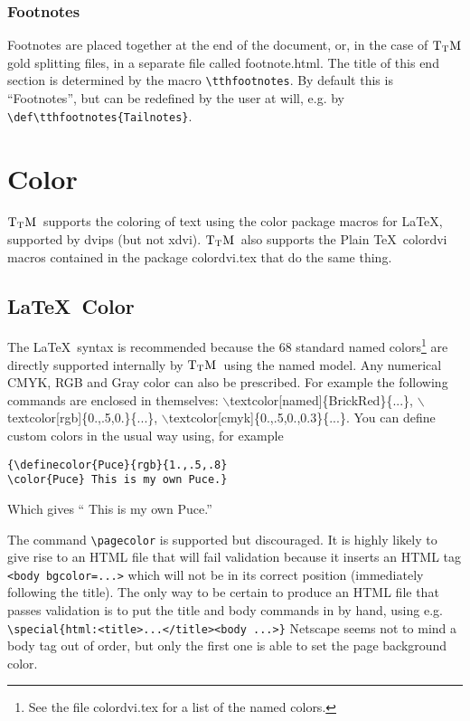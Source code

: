 \documentclass[12pt]{article}
\def\TtM{$\rm{}T_TH$}
\def\TtM{$\rm{}T_TM$}%
\begin{document}
\subsubsection{Footnotes}
Footnotes are placed together at the end of the document, or, in the
case of \TtM gold splitting files, in a separate file called
footnote.html. The title of this end section is determined by the
macro \verb!\tthfootnotes!. By default this is ``Footnotes'', but can
be redefined by the user at will, e.g. by
\verb!\def\tthfootnotes{Tailnotes}!.


\section{Color}
\TtM\ supports the coloring of text using the color package macros for
\LaTeX, supported by dvips (but not xdvi).  \TtM\ also supports the Plain
\TeX\ colordvi macros contained in the package colordvi.tex that do the
same thing. 

\subsection{\LaTeX\ Color}

The \LaTeX\ syntax is recommended because the 68 standard
named colors\footnote{See the file colordvi.tex for a list of
the named colors.} are directly supported internally by \TtM\ using the named
model. Any numerical CMYK, RGB and Gray color can also be prescribed. For
example the following commands are enclosed in themselves:
\textcolor[named]{BrickRed}{$\backslash$textcolor[named]\{BrickRed\}\{...\}},
\textcolor[rgb]{0.,.5,0.}{$\backslash$textcolor[rgb]\{0.,.5,0.\}\{...\}},
\textcolor[cmyk]{0.,.5,0.,.3}{$\backslash$textcolor[cmyk]\{0.,.5,0.,0.3\}\{...\}}.
You can define custom colors in the usual way using, for example
\begin{verbatim}
{\definecolor{Puce}{rgb}{1.,.5,.8}
\color{Puce} This is my own Puce.}
\end{verbatim}
Which gives ``{
\color{Puce}This is my own Puce.}''

The command \verb!\pagecolor! is supported but discouraged. It
is highly likely to give rise to an HTML file that will fail
validation because it inserts an HTML tag \verb!<body bgcolor=...>!
which will not be in its correct position (immediately following the
title). The only way to be certain to produce an HTML file that passes
validation is to put the title and body commands in by hand, using
e.g.  \verb!\special{html:<title>...</title><body ...>}!  Netscape
seems not to mind a body tag out of order, but only the first one is
able to set the page background color.
\end{document}
